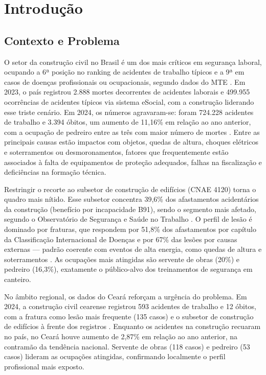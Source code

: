 \chapter{Introdução}
\label{cap:introducao}

\section{Contexto e Problema}

O setor da construção civil no Brasil é um dos mais críticos em segurança laboral, ocupando a 6ª posição no ranking de acidentes de trabalho típicos e a 9ª em casos de doenças profissionais ou ocupacionais, segundo dados do \gls{MTE} \cite{mte2024esocial}. Em 2023, o país registrou 2.888 mortes decorrentes de acidentes laborais e 499.955 ocorrências de acidentes típicos via sistema eSocial, com a construção liderando esse triste cenário. Em 2024, os números agravaram-se: foram 724.228 acidentes de trabalho e 3.394 óbitos, um aumento de 11,16\% em relação ao ano anterior, com a ocupação de pedreiro entre as três com maior número de mortes \cite{mte2025canpat}. Entre as principais causas estão impactos com objetos, quedas de altura, choques elétricos e soterramentos ou desmoronamentos, fatores que frequentemente estão associados à falta de equipamentos de proteção adequados, falhas na fiscalização e deficiências na formação técnica.

Restringir o recorte ao subsetor de construção de edifícios (\gls{CNAE} 4120) torna o quadro mais nítido. Esse subsetor concentra 39,6\% dos afastamentos acidentários da construção (benefício por incapacidade B91), sendo o segmento mais afetado, segundo o Observatório de Segurança e Saúde no Trabalho \cite{smartlab2024}. O perfil de lesão é dominado por fraturas, que respondem por 51,8\% dos afastamentos por capítulo da Classificação Internacional de Doenças e por 67\% das lesões por causas externas — padrão coerente com eventos de alta energia, como quedas de altura e soterramentos \cite{smartlab2024,moreira2024accidents}. As ocupações mais atingidas são servente de obras (20\%) e pedreiro (16,3\%), exatamente o público-alvo dos treinamentos de segurança em canteiro.

No âmbito regional, os dados do Ceará reforçam a urgência do problema. Em 2024, a construção civil cearense registrou 593 acidentes de trabalho e 12 óbitos, com a fratura como lesão mais frequente (135 casos) e o subsetor de construção de edifícios à frente dos registros \cite{sesifiec2024}. Enquanto os acidentes na construção recuaram no país, no Ceará houve aumento de 2,87\% em relação ao ano anterior, na contramão da tendência nacional. Servente de obras (118 casos) e pedreiro (53 casos) lideram as ocupações atingidas, confirmando localmente o perfil profissional mais exposto.

